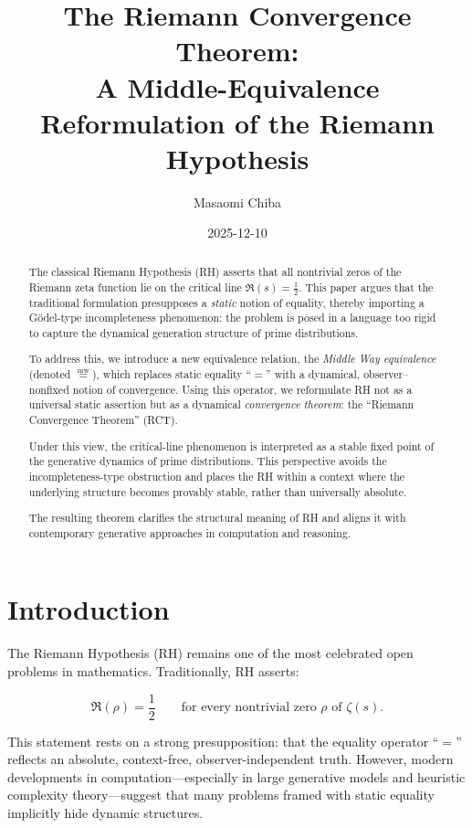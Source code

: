 \documentclass[12pt]{article}
\title{
\textbf{The Riemann Convergence Theorem:\\
A Middle-Equivalence Reformulation of the Riemann Hypothesis}
}
\author{Masaomi Chiba}
\date{2025-12-10}
\newcommand{\mweq}{\mathrel{\overset{\mathrm{mw}}{=}}}
\begin{document}
\maketitle

\begin{abstract}
The classical Riemann Hypothesis (RH) asserts that all nontrivial zeros of the
Riemann zeta function lie on the critical line $\Re(s)=\tfrac{1}{2}$.
This paper argues that the traditional formulation presupposes a \emph{static}
notion of equality, thereby importing a Gödel-type incompleteness phenomenon:
the problem is posed in a language too rigid to capture the dynamical
generation structure of prime distributions.

To address this, we introduce a new equivalence relation,
the \emph{Middle Way equivalence} (denoted $\mweq$),
which replaces static equality ``$=$'' with a dynamical,
observer–nonfixed notion of convergence.
Using this operator, we reformulate RH not as a universal static assertion
but as a dynamical \emph{convergence theorem}: the ``Riemann Convergence
Theorem'' (RCT).

Under this view, the critical-line phenomenon is interpreted as a stable
fixed point of the generative dynamics of prime distributions. 
This perspective avoids the incompleteness-type obstruction and places
the RH within a context where the underlying structure becomes provably stable,
rather than universally absolute.

The resulting theorem clarifies the structural meaning of RH and aligns it
with contemporary generative approaches in computation and reasoning.
\end{abstract}

\section{Introduction}

The Riemann Hypothesis (RH) remains one of the most celebrated open 
problems in mathematics. 
Traditionally, RH asserts:

\begin{equation}
\Re(\rho) = \frac{1}{2} \qquad 
\text{for every nontrivial zero } \rho \text{ of } \zeta(s).
\label{eq:classicalRH}
\end{equation}

This statement rests on a strong presupposition: 
that the equality operator ``$=$'' reflects an absolute, context-free,
observer-independent truth.
However, modern developments in computation---especially in 
large generative models and heuristic complexity theory---suggest that
many problems framed with static equality implicitly hide dynamic structures.
\end{document}

